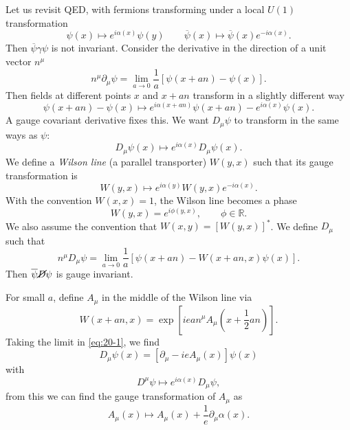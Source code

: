 Let us revisit QED, with fermions transforming under a local $U(1)$ transformation
\begin{equation}
  \psi(x) \mapsto e^{i \alpha(x)} \psi(y) \qquad \overline{\psi}{}(x) \mapsto \overline{\psi}{} (x) e^{-i \alpha(x)}.
\end{equation}
Then $\overline{\psi}{} \gamma \psi$ is not invariant.
Consider the derivative in the direction of a unit vector $n^{\mu}$
\begin{equation}
  n^{\mu} \partial_{\mu} \psi = \lim_{a \to 0} \frac{1}{a} \left[ \psi(x + an) - \psi(x)\right].
\end{equation}
Then fields at different points $x$ and $x + an$ transform in a slightly different way
\begin{equation}
  \psi(x + an) - \psi(x) \mapsto e^{i \alpha(x + an)} \psi(x + an) - e^{i \alpha(x)} \psi(x).
\end{equation}
A gauge covariant derivative fixes this.
We want $D_{\mu} \psi$ to transform in the same ways as $\psi$:
\begin{equation}
  D_{\mu}\psi(x) \mapsto e^{i \alpha(x)}D_{\mu} \psi(x).
\end{equation}
We define a \emph{Wilson line} (a parallel transporter) $W(y, x)$ such that its gauge transformation is
\begin{equation}
  W(y, x) \mapsto e^{i \alpha(y)} W(y, x) e^{-i \alpha(x)}.
\end{equation}
With the convention $W(x, x) = 1$, the Wilson line becomes a phase
\begin{equation}
  W(y, x) = e^{i \phi(y, x)}, \qquad \phi \in \mathbb{R}.
\end{equation}
We also assume the convention that $W(x, y) = [W(y, x)]^*$.
We define $D_{\mu}$ such that
\begin{equation}
  \label{eq:20-1}
  n^{\mu} D_{\mu} \psi = \lim_{a \to 0} \frac{1}{a} \left[ \psi(x + an) - W(x + an, x) \psi(x) \right] .
\end{equation}
Then $\overline{\psi}{} \cancel{D} \psi$ is gauge invariant.

For small $a$, define $A_{\mu}$ in the middle of the Wilson line via
\begin{equation}
  W(x + an, x) = \exp[i e a n^{\mu} A_{\mu} (x + \frac{1}{2} an)].
\end{equation}
Taking the limit in \eqref{eq:20-1}, we find
\begin{equation}
  D_{\mu} \psi(x) = [\partial_{\mu} - i e A_{\mu}(x)] \psi(x)
\end{equation}
with 
\begin{equation}
  D^{\mu} \psi \mapsto e^{i \alpha(x)} D_{\mu} \psi,
\end{equation}
from this we can find the gauge transformation of $A_{\mu}$ as
\begin{equation}
  A_{\mu}(x) \mapsto A_{\mu}(x) + \frac{1}{e} \partial_{\mu} \alpha(x).
\end{equation}

